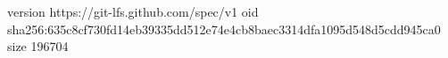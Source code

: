 version https://git-lfs.github.com/spec/v1
oid sha256:635c8cf730fd14eb39335dd512e74e4cb8baec3314dfa1095d548d5cdd945ca0
size 196704
